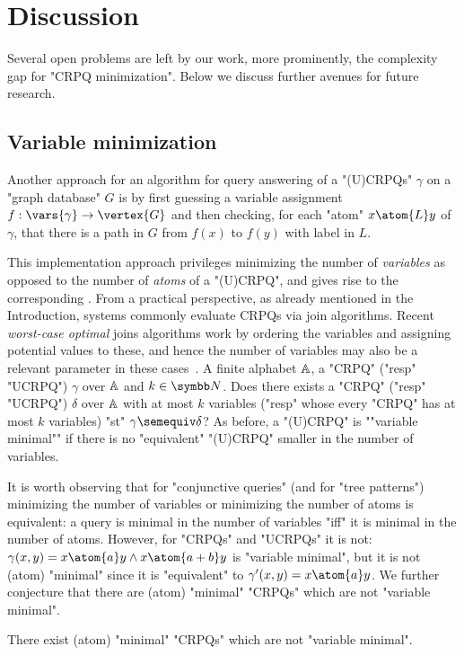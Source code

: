 \section{Discussion}
\AP\label{sec:discussion}

Several open problems are left by our work, more prominently, the complexity gap for "CRPQ minimization". Below we discuss further avenues for future research.

\subsection{Variable minimization}
\AP\label{sec:varmin}

Another approach for an algorithm for query answering of a "(U)CRPQs" $\gamma$ on a "graph database" $G$ is by first guessing a variable assignment $f: \vars{\gamma} \to \vertex{G}$ and then checking, for each "atom" $x \atom{L} y$ of $\gamma$, that there is a path in $G$ from $f(x)$ to $f(y)$ with label in $L$. 

This implementation approach privileges minimizing the number of \emph{variables} as opposed to the number of \emph{atoms} of a "(U)CRPQ", and gives rise to the corresponding . From a practical perspective, as already mentioned in the Introduction, systems commonly evaluate CRPQs via join algorithms. Recent \emph{worst-case optimal} joins algorithms work by ordering the variables and assigning potential values to these, and hence the number of variables may also be a relevant parameter in these cases~\cite{CucumidesReutterVrgoc2024SizeBounds,VrgocEtal2024MillenniumDB}. 
{A finite alphabet $\mathbb{A}$, a  "CRPQ" ("resp" "UCRPQ") $\gamma$ over $\mathbb{A}$ and $k \in \N$.}
{Does there exists a "CRPQ" ("resp" "UCRPQ") $\delta$ over $\mathbb{A}$ with at most $k$ variables 
("resp" whose every "CRPQ" has at most $k$ variables) "st" $\gamma \semequiv \delta$?}
As before, a "(U)CRPQ" is \AP""variable minimal"" if there is no "equivalent" "(U)CRPQ" smaller in the number of variables.

It is worth observing that for "conjunctive queries" (and for "tree patterns") minimizing the number of variables or minimizing the number of atoms is equivalent: a query is minimal in the number of variables "iff" it is minimal in the number of atoms.
However, for "CRPQs" and "UCRPQs" it is not: $\gamma(x,y) = x \atom{a} y \land x \atom{a+b} y$ is "variable minimal", but it is not (atom) "minimal" since it is "equivalent" to $\gamma'(x,y) = x \atom{a} y$. We further conjecture that there are (atom) "minimal" "CRPQs" which are not "variable minimal".
\begin{conjecture}
  There exist (atom) "minimal" "CRPQs" which are not "variable minimal".
\end{conjecture}

